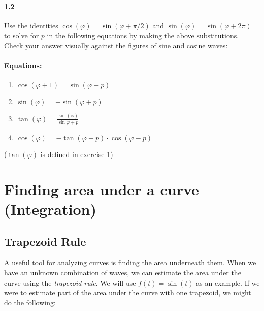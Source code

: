\documentclass{article}
\begin{document}


\paragraph{1.2} Use the identities $\cos(\varphi) = \sin(\varphi + \pi/2)$ and $\sin(\varphi) = \sin(\varphi+2\pi)$  to solve for $p$ in the following equations by making the above substitutions. Check your answer visually against the figures of sine and cosine waves:

\paragraph{Equations:}
\begin{enumerate}
\item{ $\cos(\varphi + 1) = \sin(\varphi + p)$}
\item{$\sin(\varphi) = -\sin(\varphi + p) $}
\item{$\tan(\varphi)  = \frac{\sin(\varphi)}{\sin{\varphi + p}}$}
\item{$\cos(\varphi) = -\tan(\varphi + p)\cdot \cos(\varphi - p) $}
\end{enumerate}
($\tan(\varphi)$ is defined in exercise 1)

\section{Finding area under a curve (Integration)}
\subsection{Trapezoid Rule}
A useful tool for analyzing curves is finding the area underneath them.   When we have an unknown combination of waves, we can estimate the area under the curve using the {\it trapezoid rule}.  We will use $f(t)=\sin(t)$ as an example. If we were to estimate part of the area under the curve with one trapezoid, we might do the following:\\
\end{document}
